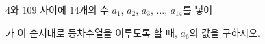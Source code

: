 $4$와 $109$ 사이에 $14$개의 수 $a_1$, $a_2$, $a_3$, $\ldots$, $a_{14}$를 넣어\par\smallskip{}\par\smallskip\noindent 가 이 순서대로 등차수열을 이루도록 할 때, $a_6$의 값을 구하시오.
